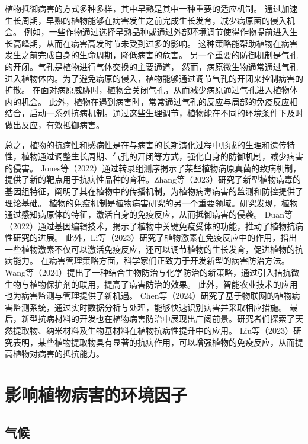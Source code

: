 \documentclass[AutoFakeBold]{LZUThesis-PgD&PhD}
\begin{document}
	植物抵御病害的方式多种多样，其中早熟是其中一种重要的适应机制。
	通过加速生长周期，早熟的植物能够在病害发生之前完成生长发育，减少病原菌的侵入机会。
	例如，一些作物通过选择早熟品种或通过外部环境调节使得作物提前进入生长高峰期，从而在病害高发时节未受到过多的影响。
	这种策略能帮助植物在病害发生之前完成自身的生命周期，降低病害的危害。
	另一个重要的防御机制是气孔的开闭。气孔是植物进行气体交换的主要通道，
	然而，病原微生物通常通过气孔进入植物体内。为了避免病原的侵入，植物能够通过调节气孔的开闭来控制病害的扩散。
	在面对病原威胁时，植物会关闭气孔，从而减少病原通过气孔进入植物体内的机会。
	此外，植物在遇到病害时，常常通过气孔的反应与局部的免疫反应相结合，启动一系列抗病机制。通过这些生理调节，植物能在不同的环境条件下及时做出反应，有效抵御病害。
	
	总之，植物的抗病性和感病性是在与病害的长期演化过程中形成的生理和遗传特性，植物通过调整生长周期、气孔的开闭等方式，强化自身的防御机制，减少病害的侵害。
	Jones等（2022）通过转录组测序揭示了某些植物病原真菌的致病机制，提供了新的靶点用于抗病性品种的育种\cite{jones2022}。Zhang等（2023）研究了新型植物病毒的基因组特征，阐明了其在植物中的传播机制，为植物病毒病害的监测和防控提供了理论基础\cite{zhang2023genomic}。
	植物的免疫机制是植物病害研究的另一个重要领域。研究发现，植物通过感知病原体的特征，激活自身的免疫反应，从而抵御病害的侵袭。
	Duan等（2022）通过基因编辑技术，揭示了植物中关键免疫受体的功能，推动了植物抗病性研究的进展\cite{duan2022gene}。
	此外，Li等（2023）研究了植物激素在免疫反应中的作用，指出一些植物激素不仅可以激活免疫反应，还可以调节植物的生长发育，促进植物的抗病能力\cite{li2023role}。
	在病害管理策略方面，科学家们正致力于开发新型的病害防治方法。
	Wang等（2024）提出了一种结合生物防治与化学防治的新策略，通过引入拮抗微生物与植物保护剂的联用，提高了病害防治的效果\cite{wang2024novel}。
	此外，智能农业技术的应用也为病害监测与管理提供了新机遇。
	Chen等（2024）研究了基于物联网的植物病害监测系统，通过实时数据分析与处理，能够快速识别病害并采取相应措施\cite{chen2024iot}。
	最后，新型抗病材料的开发也在植物病害防治中展现出广阔前景。研究者们探索了天然提取物、纳米材料及生物基材料在植物抗病性提升中的应用。
	Liu等（2023）研究表明，某些植物提取物具有显著的抗病作用，可以增强植物的免疫反应，从而提高植物对病害的抵抗能力\cite{liu2023natural}。
	
	
	\section{影响植物病害的环境因子}
	
	\subsection{气候}
	
\end{document}
